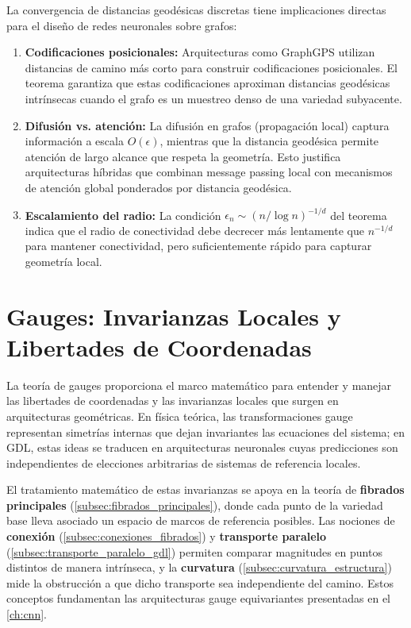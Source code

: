 	La convergencia de distancias geodésicas discretas tiene implicaciones directas para el diseño de redes neuronales sobre grafos:

\begin{enumerate}
	\item \textbf{Codificaciones posicionales:} Arquitecturas como GraphGPS \citep{rampasek2022graphgps} utilizan distancias de camino más corto para construir codificaciones posicionales. El teorema garantiza que estas codificaciones aproximan distancias geodésicas intrínsecas cuando el grafo es un muestreo denso de una variedad subyacente.
	\item \textbf{Difusión vs. atención:} La difusión en grafos (propagación local) captura información a escala $O(\epsilon)$, mientras que la distancia geodésica permite atención de largo alcance que respeta la geometría. Esto justifica arquitecturas híbridas que combinan message passing local con mecanismos de atención global ponderados por distancia geodésica.
	\item \textbf{Escalamiento del radio:} La condición $\epsilon_n \sim (n / \log n)^{-1/d}$ del teorema indica que el radio de conectividad debe decrecer más lentamente que $n^{-1/d}$ para mantener conectividad, pero suficientemente rápido para capturar geometría local.
\end{enumerate}


\section{Gauges: Invarianzas Locales y Libertades de Coordenadas}\label{sec:gauges_invarianzas}

La teoría de gauges proporciona el marco matemático para entender y manejar las libertades de coordenadas y las invarianzas locales que surgen en arquitecturas geométricas. En física teórica, las transformaciones gauge representan simetrías internas que dejan invariantes las ecuaciones del sistema; en \gls{GDL}, estas ideas se traducen en arquitecturas neuronales cuyas predicciones son independientes de elecciones arbitrarias de sistemas de referencia locales.

El tratamiento matemático de estas invarianzas se apoya en la teoría de \textbf{fibrados principales} (\autoref{subsec:fibrados_principales}), donde cada punto de la variedad base lleva asociado un espacio de marcos de referencia posibles. Las nociones de \textbf{conexión} (\autoref{subsec:conexiones_fibrados}) y \textbf{transporte paralelo} (\autoref{subsec:transporte_paralelo_gdl}) permiten comparar magnitudes en puntos distintos de manera intrínseca, y la \textbf{curvatura} (\autoref{subsec:curvatura_estructura}) mide la obstrucción a que dicho transporte sea independiente del camino. Estos conceptos fundamentan las arquitecturas gauge equivariantes presentadas en el \autoref{ch:cnn}.

